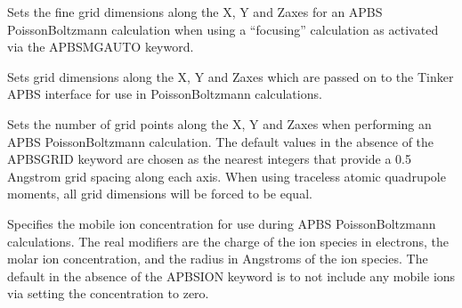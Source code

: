 \documentclass[letterpaper,11pt,english]{sphinxmanual}
\begin{document}
\ignorespaces {}\label{\detokenize{text/keywords:key-apbs-fgrid}}\begin{description}
\sphinxAtStartPar
Sets the fine grid dimensions along the X\sphinxhyphen{}, Y\sphinxhyphen{} and Z\sphinxhyphen{}axes for an APBS Poisson\sphinxhyphen{}Boltzmann calculation when using a “focusing” calculation as activated via the APBS\sphinxhyphen{}MG\sphinxhyphen{}AUTO keyword.

\end{description}

\ignorespaces {}\label{\detokenize{text/keywords:key-apbs-gcent}}\begin{description}
\sphinxAtStartPar
Sets grid dimensions along the X\sphinxhyphen{}, Y\sphinxhyphen{} and Z\sphinxhyphen{}axes which are passed on to the Tinker APBS interface for use in Poisson\sphinxhyphen{}Boltzmann calculations.

\end{description}

\ignorespaces {}\label{\detokenize{text/keywords:key-apbs-grid}}\begin{description}
\sphinxAtStartPar
Sets the number of grid points along the X\sphinxhyphen{}, Y\sphinxhyphen{} and Z\sphinxhyphen{}axes when performing an APBS Poisson\sphinxhyphen{}Boltzmann calculation. The default values in the absence of the APBS\sphinxhyphen{}GRID keyword are chosen as the nearest integers that provide a 0.5 Angstrom grid spacing along each axis. When using traceless atomic quadrupole moments, all grid dimensions will be forced to be equal.

\end{description}

\ignorespaces {}\label{\detokenize{text/keywords:key-apbs-ion}}\begin{description}
\sphinxAtStartPar
Specifies the mobile ion concentration for use during APBS Poisson\sphinxhyphen{}Boltzmann calculations. The real modifiers are the charge of the ion species in electrons, the molar ion concentration, and the radius in Angstroms of the ion species. The default in the absence of the APBS\sphinxhyphen{}ION keyword is to not include any mobile ions via setting the concentration to zero.

\end{description}
\end{document}
